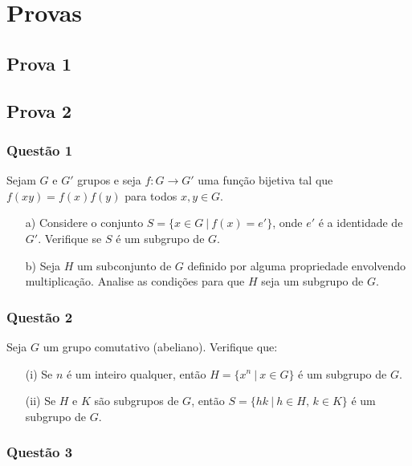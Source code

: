 \section{Provas}

\subsection{Prova 1}

\subsection{Prova 2}
    \subsubsection*{Questão 1}

    Sejam $G$ e $G'$ grupos e seja $f: G \to G'$ uma função bijetiva tal que $f(xy) = f(x)f(y)$ para todos $x, y \in G$.

    \begin{enumerate}
        \item[a)] Considere o conjunto $S = \{ x \in G\ |\ f(x) = e' \}$, onde $e'$ é a identidade de $G'$. Verifique se $S$ é um subgrupo de $G$.
        \item[b)] Seja $H$ um subconjunto de $G$ definido por alguma propriedade envolvendo multiplicação. Analise as condições para que $H$ seja um subgrupo de $G$.
    \end{enumerate}

    \vspace{1em}

    \subsubsection*{Questão 2}

    Seja $G$ um grupo comutativo (abeliano). Verifique que:
    \begin{enumerate}
        \item [(i)] Se $n$ é um inteiro qualquer, então $H = \{ x^n\ |\ x \in G \}$ é um subgrupo de $G$.
        \item [(ii)] Se $H$ e $K$ são subgrupos de $G$, então $S = \{ hk\ |\ h \in H,\, k \in K \}$ é um subgrupo de $G$.
    \end{enumerate}

    \subsubsection*{Questão 3}

